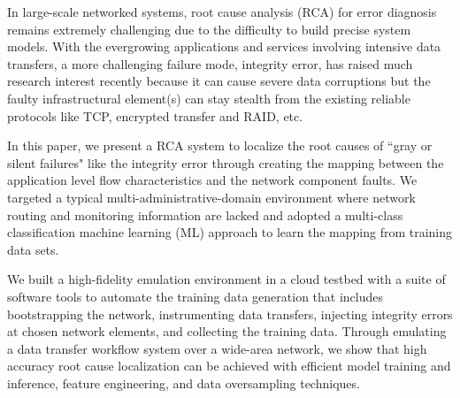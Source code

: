 In large-scale networked systems, root cause analysis (RCA) for error diagnosis 
remains extremely challenging due to the difficulty to build precise system models.
With the evergrowing applications and services involving intensive data transfers, 
a more challenging failure mode, integrity error, has raised much research interest recently 
because it can cause severe data corruptions but the faulty infrastructural element(s) 
can stay stealth from the existing reliable protocols like TCP, encrypted transfer and RAID, etc.

In this paper, we present a RCA system to localize the root causes of ``gray or silent failures" like the integrity error through creating the mapping between the application 
level flow characteristics and the network component faults. We targeted a typical multi-administrative-domain environment where network routing 
and monitoring information are lacked and adopted a multi-class classification machine learning (ML) approach to learn the mapping from training data sets. 

We built a high-fidelity emulation environment in a cloud testbed with a suite of software tools to automate the training data generation that includes bootstrapping the network, 
instrumenting data transfers, injecting integrity errors at chosen network elements, and collecting the training data. Through emulating a data transfer workflow system over a wide-area network, 
we show that high accuracy root cause localization can be achieved with efficient model training and inference, feature engineering, and data oversampling techniques.
